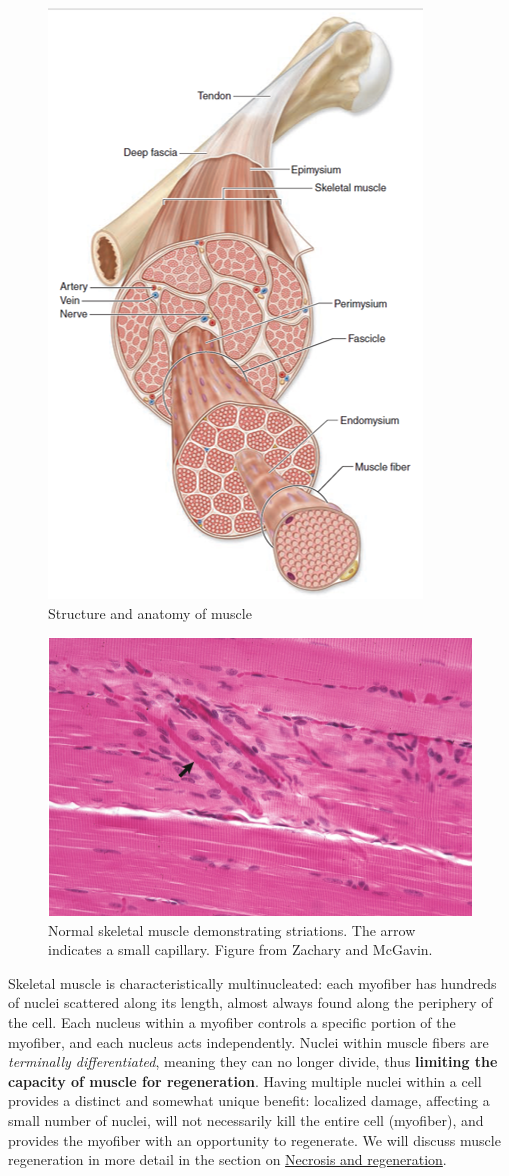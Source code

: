 \documentclass[openany]{book}
\begin{document}
\begin{figure}

{\centering \includegraphics[width=0.4\linewidth]{images/muscle_structure} 

}

\caption{Structure and anatomy of muscle}\label{fig:muscle-structure}
\end{figure}

\begin{figure}

{\centering \includegraphics[width=0.5\linewidth]{images/muscle_histo} 

}

\caption{Normal skeletal muscle demonstrating striations. The arrow indicates a small capillary. Figure from Zachary and McGavin.}\label{fig:muscle-histo}
\end{figure}

Skeletal muscle is characteristically multinucleated: each myofiber has
hundreds of nuclei scattered along its length, almost always found along
the periphery of the cell. Each nucleus within a myofiber controls a
specific portion of the myofiber, and each nucleus acts independently.
Nuclei within muscle fibers are \emph{terminally differentiated},
meaning they can no longer divide, thus \textbf{limiting the capacity of
muscle for regeneration}. Having multiple nuclei within a cell provides
a distinct and somewhat unique benefit: localized damage, affecting a
small number of nuclei, will not necessarily kill the entire cell
(myofiber), and provides the myofiber with an opportunity to regenerate.
We will discuss muscle regeneration in more detail in the section on
\protect\hyperlink{necrosis-and-regeneration}{Necrosis and
regeneration}.
\end{document}
